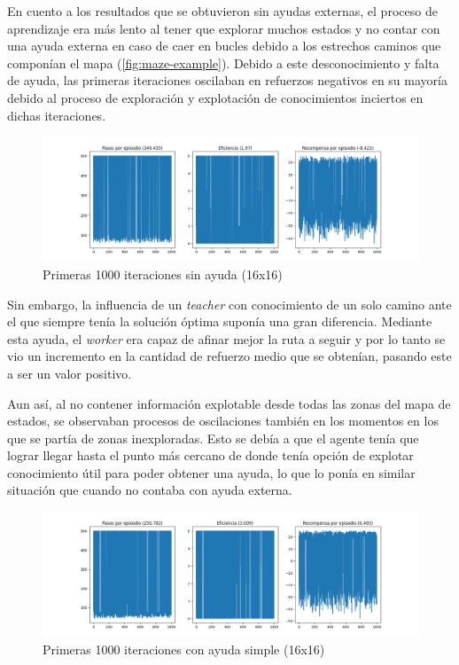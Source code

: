 \documentclass[letterpaper]{article} %
\begin{document}
En cuento a los resultados que se obtuvieron sin ayudas externas, el proceso de aprendizaje era más lento al tener que explorar muchos estados y
 no contar con una ayuda externa en caso de caer en bucles debido a los estrechos caminos que componían el mapa (\ref{fig:maze-example}). Debido
  a este desconocimiento y falta de ayuda, las primeras iteraciones oscilaban en refuerzos negativos en su mayoría debido al proceso de exploración
   y explotación de conocimientos inciertos en dichas iteraciones. 

\begin{figure}[H]
    \centering
    \includegraphics[width=0.9\columnwidth]{sin_ayuda_externa.png}
    \caption{Primeras 1000 iteraciones sin ayuda (16x16)\label{fig:FuN1}}
\end{figure}

Sin embargo, la influencia de un \textit{teacher} con conocimiento de un solo camino ante el que siempre tenía la solución óptima suponía una gran diferencia.
 Mediante esta ayuda, el \textit{worker} era capaz de afinar mejor la ruta a seguir y por lo tanto se vio un incremento en la cantidad de refuerzo medio que 
 se obtenían, pasando este a ser un valor positivo.

Aun así, al no contener información explotable desde todas las zonas del mapa de estados, se observaban procesos de oscilaciones también en los momentos
 en los que se partía de zonas inexploradas. Esto se debía a que el agente tenía que lograr llegar hasta el punto más cercano de donde tenía opción 
 de explotar conocimiento útil para poder obtener una ayuda, lo que lo ponía en similar situación que cuando no contaba con ayuda externa.

\begin{figure}[H]
    \centering
    \includegraphics[width=0.9\columnwidth]{ayuda_externa_1path.png}
    \caption{Primeras 1000 iteraciones con ayuda simple (16x16)\label{fig:FuN2}}
    
\end{figure}
\end{document}
